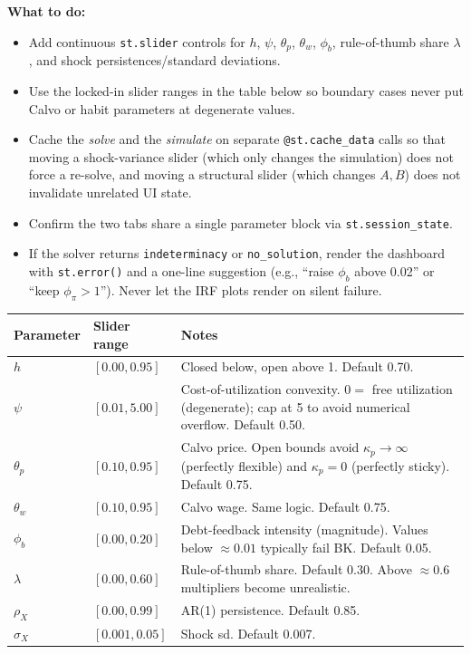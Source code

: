 \documentclass[11pt]{article}
\begin{document}
\textbf{What to do:}
\begin{itemize}
    \item Add continuous \texttt{st.slider} controls for $h$, $\psi$, $\theta_p$, $\theta_w$, $\phi_b$, rule-of-thumb share $\lambda$, and shock persistences/standard deviations.
    \item Use the locked-in slider ranges in the table below so boundary cases never put Calvo or habit parameters at degenerate values.
    \item Cache the \emph{solve} and the \emph{simulate} on separate \texttt{@st.cache\_data} calls so that moving a shock-variance slider (which only changes the simulation) does not force a re-solve, and moving a structural slider (which changes $A, B$) does not invalidate unrelated UI state.
    \item Confirm the two tabs share a single parameter block via \texttt{st.session\_state}.
    \item If the solver returns \texttt{indeterminacy} or \texttt{no\_solution}, render the dashboard with \texttt{st.error()} and a one-line suggestion (e.g., ``raise $\phi_b$ above 0.02'' or ``keep $\phi_\pi > 1$''). Never let the IRF plots render on silent failure.
\end{itemize}

\begin{tabularx}{\linewidth}{@{}p{2.3cm}p{3.2cm}X@{}}
\toprule
\textbf{Parameter} & \textbf{Slider range} & \textbf{Notes} \\
\midrule
$h$ & $[0.00, 0.95]$ & Closed below, open above 1. Default 0.70. \\
$\psi$ & $[0.01, 5.00]$ & Cost-of-utilization convexity. $0 =$ free utilization (degenerate); cap at 5 to avoid numerical overflow. Default 0.50. \\
$\theta_p$ & $[0.10, 0.95]$ & Calvo price. Open bounds avoid $\kappa_p \to \infty$ (perfectly flexible) and $\kappa_p = 0$ (perfectly sticky). Default 0.75. \\
$\theta_w$ & $[0.10, 0.95]$ & Calvo wage. Same logic. Default 0.75. \\
$\phi_b$ & $[0.00, 0.20]$ & Debt-feedback intensity (magnitude). Values below $\approx 0.01$ typically fail BK. Default 0.05. \\
$\lambda$ & $[0.00, 0.60]$ & Rule-of-thumb share. Default 0.30. Above $\approx 0.6$ multipliers become unrealistic. \\
$\rho_X$ & $[0.00, 0.99]$ & AR(1) persistence. Default 0.85. \\
$\sigma_X$ & $[0.001, 0.05]$ & Shock sd. Default 0.007. \\
\bottomrule
\end{tabularx}
\end{document}

